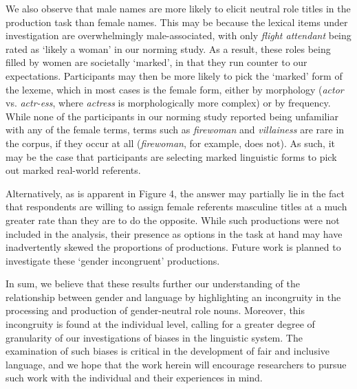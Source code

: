 \documentclass[10pt,letterpaper]{article}
\begin{document}
	We also observe that male names are more likely to elicit neutral role titles in the production task than female names. This may be because the lexical items under investigation are overwhelmingly male-associated, with only \textit{flight attendant} being rated as `likely a woman' in our norming study. As a result, these roles being filled by women are societally `marked', in that they run counter to our expectations. Participants may then be more likely to pick the `marked' form of the lexeme, which in most cases is the female form, either by morphology (\textit{actor} vs. \textit{actr-ess}, where \textit{actress} is morphologically more complex) or by frequency. While none of the participants in our norming study reported being unfamiliar with any of the female terms, terms such as \textit{firewoman} and \textit{villainess} are rare in the corpus, if they occur at all (\textit{firewoman}, for example, does not). As such, it may be the case that participants are selecting marked linguistic forms to pick out marked real-world referents.\par 
	Alternatively, as is apparent in Figure 4, the answer may partially lie in the fact that respondents are willing to assign female referents masculine titles at a much greater rate than they are to do the opposite. While such productions were not included in the analysis, their presence as options in the task at hand may have inadvertently skewed the proportions of productions. Future work is planned to investigate these `gender incongruent' productions.\par 
	In sum, we believe that these results further our understanding of the relationship between gender and language by highlighting an incongruity in the processing and production of gender-neutral role nouns. Moreover, this incongruity is found at the individual level, calling for a greater degree of granularity of our investigations of biases in the linguistic system. The examination of such biases is critical in the development of fair and inclusive language, and we hope that the work herein will encourage researchers to pursue such work with the individual and their experiences in mind. 
	

	\newpage
	\nocite{gal1995boundaries}
	\printbibliography
	
	
	
\end{document}
